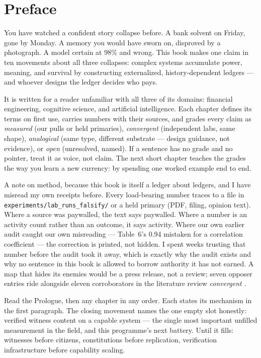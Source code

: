 \chapter*{Preface}

You have watched a confident story collapse before. A bank solvent on Friday, gone by Monday. A memory you would have sworn on, disproved by a photograph. A model certain at 98\% and wrong. This book makes one claim in ten movements about all three collapses: complex systems accumulate power, meaning, and survival by constructing externalized, history-dependent ledgers --- and whoever designs the ledger decides who pays.

It is written for a reader unfamiliar with all three of its domains: financial engineering, cognitive science, and artificial intelligence. Each chapter defines its terms on first use, carries numbers with their sources, and grades every claim as \textit{measured} (our pulls or held primaries), \textit{convergent} (independent labs, same shape), \textit{analogical} (same type, different substrate --- design guidance, not evidence), or \textit{open} (unresolved, named). If a sentence has no grade and no pointer, treat it as voice, not claim. The next short chapter teaches the grades the way you learn a new currency: by spending one worked example end to end.

A note on method, because this book is itself a ledger about ledgers, and I have misread my own receipts before. Every load-bearing number traces to a file in \texttt{experiments/lab\_runs\_falsify/} or a held primary (PDF, filing, opinion text). Where a source was paywalled, the text says paywalled. Where a number is an activity count rather than an outcome, it says activity. Where our own earlier audit caught our own misreading --- Table~6's 0.94 mistaken for a correlation coefficient --- the correction is printed, not hidden. I spent weeks trusting that number before the audit took it away, which is exactly why the audit exists and why no sentence in this book is allowed to borrow authority it has not earned. A map that hides its enemies would be a press release, not a review; seven opposer entries ride alongside eleven corroborators in the literature review \textit{convergent} \citep{henrich}.

Read the Prologue, then any chapter in any order. Each states its mechanism in the first paragraph. The closing movement names the one empty slot honestly: verified witness content on a capable system --- the single most important unfilled measurement in the field, and this programme's next battery. Until it fills: witnesses before citizens, constitutions before replication, verification infrastructure before capability scaling.

